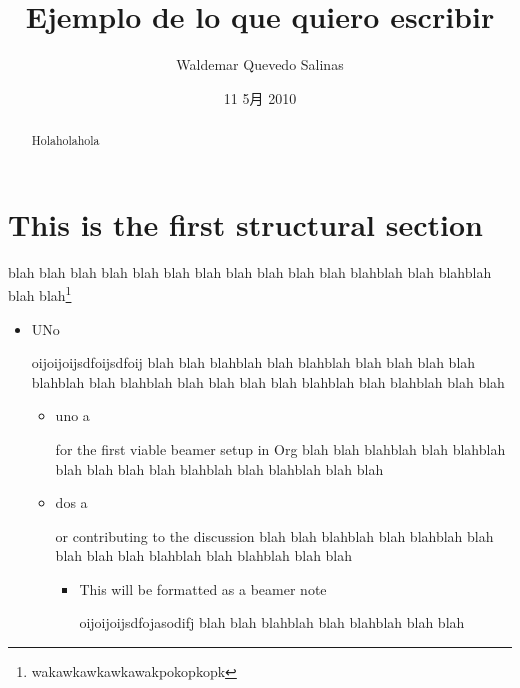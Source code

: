 \documentclass[journal]{IEEEtran}
\title{Ejemplo de lo que quiero escribir}
\author{Waldemar Quevedo Salinas}
\date{11 5月 2010}
\begin{document}
\maketitle

\setcounter{tocdepth}{3}
\tableofcontents
\vspace*{1cm}

\begin{abstract}
Holaholahola
\end{abstract}

\section{This is the first structural section}
\label{sec-1}


blah blah blah blah blah blah blah blah blah
blah blah blahblah blah blahblah blah blah\footnote{wakawkawkawkawakpokopkopk }

\begin{itemize}

\item UNo\\
\label{sec-1.1}

oijoijoijsdfoijsdfoij
blah blah blahblah blah blahblah blah blah
blah blah blahblah blah blahblah blah blah
blah blah blahblah blah blahblah blah blah

\begin{itemize}

\item uno a\\
\label{sec-1.1.1}

for the first viable beamer setup in Org
blah blah blahblah blah blahblah blah blah
blah blah blahblah blah blahblah blah blah


\item dos a\\
\label{sec-1.1.2}

or contributing to the discussion
blah blah blahblah blah blahblah blah blah
blah blah blahblah blah blahblah blah blah
    
\begin{itemize}

\item This will be formatted as a beamer note\\
\label{sec-1.1.2.1}

oijoijoijsdfojasodifj
blah blah blahblah blah blahblah blah blah

\end{itemize} %
\end{itemize} %
\end{itemize} %
\end{document}
